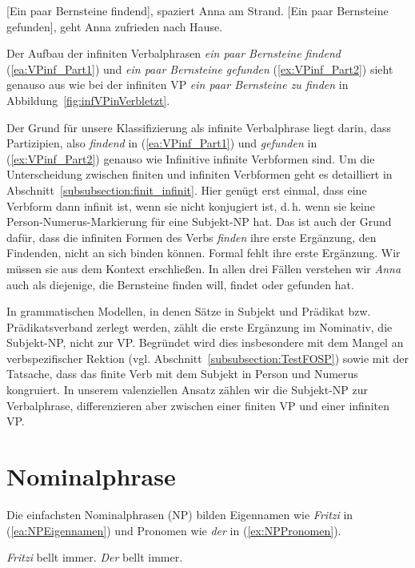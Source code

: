 \ea \label{ea:VPinf_Part}
\ea \label{ea:VPinf_Part1} [Ein paar Bernsteine findend], spaziert Anna am Strand.
\ex \label{ex:VPinf_Part2} [Ein paar Bernsteine gefunden], geht Anna zufrieden nach Hause.
\z 
\z 

Der Aufbau der infiniten Verbalphrasen \textit{ein paar Bernsteine findend} (\ref{ea:VPinf_Part1}) und \textit{ein paar Bernsteine gefunden} (\ref{ex:VPinf_Part2}) sieht genauso aus wie bei der infiniten VP \textit{ein paar Bernsteine zu finden} in Abbildung~\ref{fig:infVPinVerbletzt}.  

Der Grund für unsere Klassifizierung als infinite Verbalphrase liegt darin, dass Partizipien, also \textit{findend} in (\ref{ea:VPinf_Part1}) und \textit{gefunden} in (\ref{ex:VPinf_Part2}) genauso wie Infinitive infinite Verbformen sind. Um die Unterscheidung zwischen finiten und infiniten Verbformen geht es detailliert in Abschnitt~\ref{subsubsection:finit_infinit}. Hier genügt erst einmal, dass eine Verbform dann infinit ist, wenn sie nicht konjugiert ist, d.\,h. wenn sie keine Person-Numerus-Markierung für eine Subjekt-NP hat. Das ist auch der Grund dafür, dass die infiniten Formen des Verbs \textit{finden} ihre erste Ergänzung, den Findenden, nicht an sich binden können. Formal fehlt ihre erste Ergänzung. Wir müssen sie aus dem Kontext erschließen. In allen drei Fällen verstehen wir \textit{Anna} auch als diejenige, die Bernsteine finden will, findet oder gefunden hat.

In grammatischen Modellen, in denen Sätze in Subjekt und Prädikat bzw. Prädikatsverband zerlegt werden, zählt die erste Ergänzung im Nominativ, die Subjekt-NP, nicht zur VP. Begründet wird dies insbesondere mit dem Mangel an verbspezifischer Rektion (vgl. Abschnitt~\ref{subsubsection:TestFOSP}) sowie mit der Tatsache, dass das finite Verb mit dem Subjekt in Person und Numerus kongruiert. In unserem valenziellen Ansatz zählen wir die Subjekt-NP zur Verbalphrase, differenzieren aber zwischen einer finiten VP und einer infiniten VP.   



\section{Nominalphrase}\label{section:NP}

Die einfachsten Nominalphrasen (NP) bilden Eigennamen wie \textit{Fritzi} in (\ref{ea:NPEigennamen}) und Pronomen wie \textit{der} in (\ref{ex:NPPronomen}).  

\ea \label{ea:NPEigennamenPronomen}
\ea \label{ea:NPEigennamen} \textit{Fritzi} bellt immer.
\ex \label{ex:NPPronomen} \textit{Der} bellt immer.
\z 
\z 

